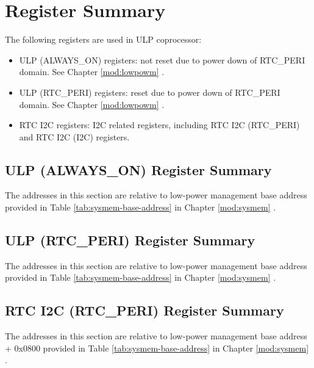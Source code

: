 \documentclass[main\_\_EN.tex]{subfiles}
\begin{document}
\hypertarget{ulp-reg-summ}{}
\section{Register Summary}
\label{ulp-reg-summ}

The following registers are used in ULP coprocessor:

\begin{itemize}
    \item ULP (ALWAYS\_ON) registers: not reset due to power down of RTC\_PERI domain. See Chapter \ref{mod:lowpowm} \textit{}.
    \item ULP (RTC\_PERI) registers: reset due to power down of RTC\_PERI domain. See Chapter \ref{mod:lowpowm} \textit{}.
    \item RTC I2C registers: I2C related registers, including RTC I2C (RTC\_PERI) and RTC I2C (I2C) registers.
\end{itemize}


\subsection{ULP (ALWAYS\_ON) Register Summary}
The addresses in this section are relative to low-power management base address provided in Table \ref{tab:sysmem-base-address} in Chapter \ref{mod:sysmem} \textit{}.



\subsection{ULP (RTC\_PERI) Register Summary}

The addresses in this section are relative to low-power management base address provided in Table \ref{tab:sysmem-base-address} in Chapter \ref{mod:sysmem} \textit{}.



\subsection{RTC I2C (RTC\_PERI) Register Summary}
The addresses in this section are relative to low-power management base address + 0x{}0800 provided in Table \ref{tab:sysmem-base-address} in Chapter \ref{mod:sysmem} \textit{}.
\end{document}
